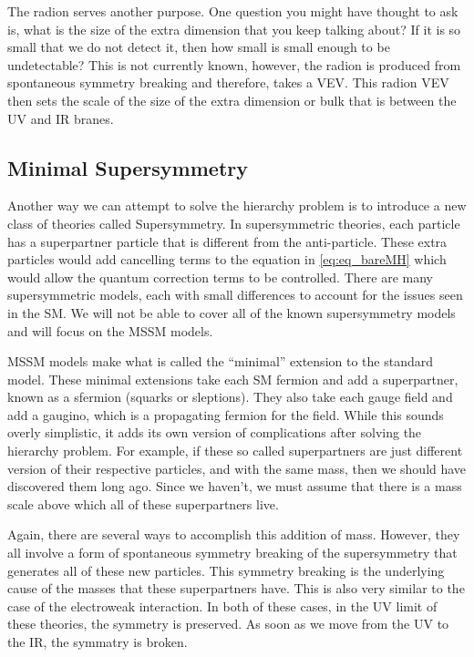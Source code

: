 The radion serves another purpose. One question you might have thought to ask is, what is the size of the extra dimension that you keep talking about? 
If it is so small that we do not detect it, then how small is small enough to be undetectable? 
This is not currently known, however, the radion is produced from spontaneous symmetry breaking and therefore, takes a VEV.
This radion VEV then sets the scale of the size of the extra dimension or bulk that is between the UV and IR branes. 

\subsection{Minimal Supersymmetry}

Another way we can attempt to solve the hierarchy problem is to introduce a new class of theories called Supersymmetry.
In supersymmetric theories, each particle has a superpartner particle that is different from the anti-particle.
These extra particles would add cancelling terms to the equation in \ref{eq:eq_bareMH} which would allow the quantum correction terms to be controlled.
There are many supersymmetric models, each with small differences to account for the issues seen in the SM. We will not be able to cover all of the known supersymmetry models and will focus on the MSSM models.

MSSM models make what is called the ``minimal'' extension to the standard model. These minimal extensions take each SM fermion and add a superpartner, known as a sfermion (squarks or sleptions).
They also take each gauge field and add a gaugino, which is a propagating fermion for the field.
While this sounds overly simplistic, it adds its own version of complications after solving the hierarchy problem. 
For example, if these so called superpartners are just different version of their respective particles, and with the same mass, then we should have discovered them long ago.
Since we haven't, we must assume that there is a mass scale above which all of these superpartners live. 

Again, there are several ways to accomplish this addition of mass. 
However, they all involve a form of spontaneous symmetry breaking of the supersymmetry that generates all of these new particles.
This symmetry breaking is the underlying cause of the masses that these superpartners have. This is also very similar to the case of the electroweak interaction. 
In both of these cases, in the UV limit of these theories, the symmetry is preserved. As soon as we move from the UV to the IR, the symmatry is broken. 

